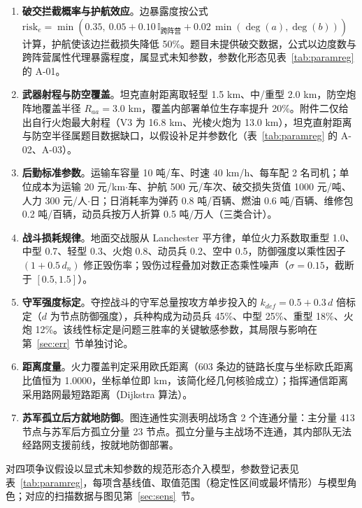 \documentclass[12pt,a4paper]{ctexart}
\begin{document}
\begin{enumerate}[label=\textbf{假设\arabic*.},leftmargin=0pt,itemsep=0.4em]
\item \textbf{破交拦截概率与护航效应}。边暴露度按公式 $\mathrm{risk}_e=\min(0.35,\ 0.05+0.10\,\mathbb{I}_{\text{跨阵营}}+0.02\,\min(\deg(a),\deg(b)))$ 计算，护航使该边拦截损失降低 50\%。题目未提供破交数据，公式以边度数与跨阵营属性代理暴露程度，属显式未知参数，参数化形态见表~\ref{tab:paramreg} 的 A-01。
\item \textbf{武器射程与防空覆盖}。坦克直射距离取轻型 1.5 km、中/重型 2.0 km，防空炮阵地覆盖半径 $R_{aa}=3.0$ km，覆盖内部署单位生存率提升 20\%。附件二仅给出自行火炮最大射程（V3 为 16.8 km、光棱火炮为 13.0 km），坦克直射距离与防空半径属题目数据缺口，以假设补足并参数化（表~\ref{tab:paramreg} 的 A-02、A-03）。
\item \textbf{后勤标准参数}。运输车容量 10 吨/车、时速 40 km/h、每车配 2 名司机；单位成本为运输 20 元/km$\cdot$车、护航 500 元/车次、破交损失货值 1000 元/吨、人力 300 元/人$\cdot$日；日消耗率为弹药 0.8 吨/百辆、燃油 0.6 吨/百辆、维修包 0.2 吨/百辆，动员兵按万人折算 0.5 吨/万人（三类合计）。
\item \textbf{战斗损耗规律}。地面交战服从 Lanchester 平方律，单位火力系数取重型 1.0、中型 0.7、轻型 0.3、火炮 0.8、动员兵 0.2、空中 0.5，防御强度以乘性因子 $(1+0.5\,d_n)$ 修正毁伤率；毁伤过程叠加对数正态乘性噪声（$\sigma=0.15$，截断于 $[0.5,1.5]$）。
\item \textbf{守军强度标定}。夺控战斗的守军总量按攻方单步投入的 $k_{def}=0.5+0.3\,d$ 倍标定（$d$ 为节点防御强度），兵种构成为动员兵 45\%、中型 25\%、重型 18\%、火炮 12\%。该线性标定是问题三胜率的关键敏感参数，其局限与影响在第~\ref{sec:err}~节单独讨论。
\item \textbf{距离度量}。火力覆盖判定采用欧氏距离（603 条边的链路长度与坐标欧氏距离比值恒为 1.0000，坐标单位即 km，该简化经几何核验成立）；指挥通信距离采用路网最短路距离（Dijkstra 算法）。
\item \textbf{苏军孤立后方就地防御}。图连通性实测表明战场含 2 个连通分量：主分量 413 节点与苏军后方孤立分量 23 节点。孤立分量与主战场不连通，其内部队无法经路网支援前线，按就地防御部署。
\end{enumerate}

对四项争议假设以显式未知参数的规范形态介入模型，参数登记表见表~\ref{tab:paramreg}，每项含基线值、取值范围（稳定性区间或最坏情形）与模型角色；对应的扫描数据与图见第~\ref{sec:sens}~节。
\end{document}
